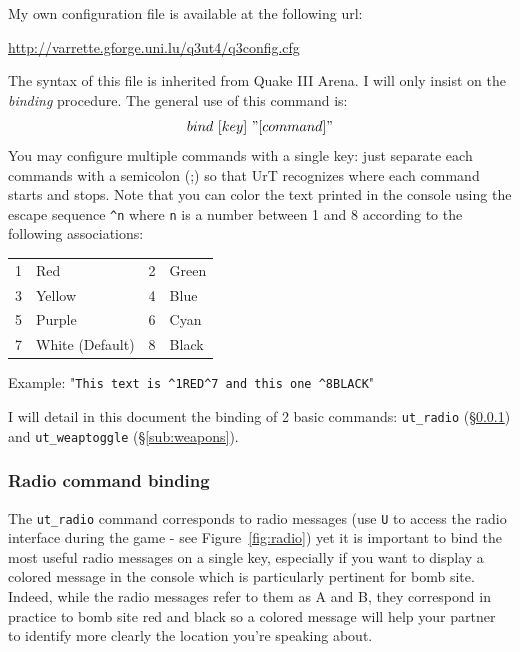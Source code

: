 \noindent My own configuration file is available at the following url:
\begin{center}
  \url{http://varrette.gforge.uni.lu/q3ut4/q3config.cfg}
\end{center}

\noindent The syntax of this file is inherited from Quake III Arena. I
will only insist on the \emph{binding} procedure. The general use of this
command is: 
\[ bind\  [key]\ "[command]" \]
You may configure multiple commands with a single key: just separate each
commands with a semicolon (;) so that UrT recognizes where each command starts
and stops. 
Note that you can color the text printed in the console using the escape
sequence \verb!^n! where \texttt{n} is a number between 1 and 8 according to the
following associations: 
\begin{center}
  \begin{tabular}[h]{clcl}
    1 & Red    & 2 & Green \\
    3 & Yellow & 4 & Blue  \\
    5 & Purple & 6 & Cyan  \\
    7 & White (Default) & 8 & Black 
  \end{tabular}
\end{center}
Example: "\verb!This text is ^1RED^7 and this one ^8BLACK!"

I will detail in this document the binding of 2 basic commands:
\texttt{ut\_radio} (\S\ref{sub:radio}) and \texttt{ut\_weaptoggle}
(\S\ref{sub:weapons}).  

\subsubsection{Radio command binding}
\label{sub:radio}


The \texttt{ut\_radio} command corresponds to
radio messages (use \texttt{U} to access the radio interface during the game -
see Figure~\ref{fig:radio}) yet it is important to bind the most useful radio
messages on a single key, especially if you want to display a colored message in
the console which is particularly pertinent for bomb site. 
Indeed, while the radio messages refer to them as A and B, they
correspond in practice to bomb site red and black so a colored message will help
your partner to identify more clearly the location you're speaking about.  
      
